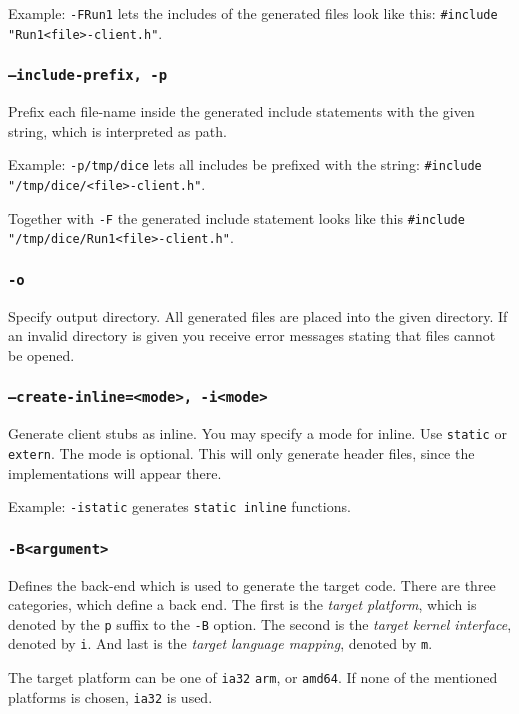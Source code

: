Example: \verb|-FRun1| lets the includes of the generated files
look like this: \verb|#include "Run1<file>-client.h"|.

\subsubsection{{\tt --include-prefix, -p}}
Prefix each file-name inside the generated include statements
with the given string, which is interpreted as path.

Example: \verb|-p/tmp/dice| lets all includes be prefixed with
the string: \verb|#include "/tmp/dice/<file>-client.h"|.

Together with \verb|-F| the generated include statement looks like this
\verb|#include "/tmp/dice/Run1<file>-client.h"|.

\subsubsection{{\tt -o}}
Specify output directory. All generated files are placed into the
given directory. If an invalid directory is given you receive error
messages stating that files cannot be opened.

\subsubsection{{\tt --create-inline=<mode>, -i<mode>}}
Generate client stubs as inline. You may specify a mode for
inline. Use \verb|static| or \verb|extern|. The mode is optional.
This will only generate header files, since the implementations
will appear there.

Example: \verb|-istatic| generates \verb|static inline| functions.

\subsubsection{{\tt -B<argument>}}

Defines the back-end which is used to generate the target code. There are
three categories, which define a back end. The first is the {\it target
platform}, which is denoted by the {\tt p} suffix to the {\tt -B} option.  The
second is the {\it target kernel interface}, denoted by {\tt i}. And last is
the {\it target language mapping}, denoted by {\tt m}.

The target platform can be one of {\tt ia32} {\tt arm}, or {\tt amd64}.  If
none of the mentioned platforms is chosen, {\tt ia32} is used.

